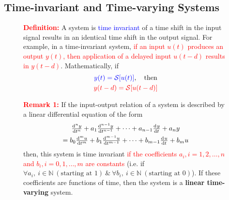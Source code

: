 \documentclass[../notes-main.tex]{subfiles}
\begin{document}
\subsection{Time-invariant and Time-varying Systems}
\begin{figure}[H]
    \centering
    \begin{mdframed}
        \begin{center}
            \textcolor{red}{\textbf{Definition:}} A system is \textcolor{blue}{time invariant} of a time shift in the input signal results in an identical time shift in the output signal. For example, in a time-invariant system, \textcolor{red}{if an input \(u(t)\) produces an output \(y(t)\), then application of a delayed input \(u(t - d)\) results in \(y(t - d)\)}. Mathematically, if
            \begin{gather}
                \textcolor{blue}{y(t) = \mathcal{S}[u(t)]}, \quad \text{then}\\ \textcolor{red}{y(t - d) = \mathcal{S}[u(t - d)]}
                \label{eq:time-invariant-system-def-1}
            \end{gather}
        \end{center}
    \end{mdframed}\label{fig:time-invariant-system-def-1}
    \vspace{-1em}
\end{figure}
\begin{figure}[H]
    \centering
    \begin{mdframed}
        \begin{center}
            \textcolor{red}{\textbf{Remark 1:}} If the input-output relation of a system is described by a linear differential equation of the form
            \begin{gather}
                \od[n]{y}{t} + a_1\od[n-1]{y}{t} + \dots + a_{n-1} \od{y}{t} + a_ny\\ 
                = b_0\od[m]{u}{t} + b_1\od[m-1]{u}{t} + \dots + b_{m-1}\od{u}{t} + b_mu
            \end{gather}
            then, this system is time invariant \textcolor{red}{if the coefficients \(a_i, i = 1,2,\ldots,n\) and \(b_i, i = 0,1,\ldots,m\) are constants} (i.e. if \(\forall a_i, \ i \in \mathbb{N}\ (\text{starting at 1})\ \& \ \forall b_i, \ i \in \mathbb{N}\ (\text{starting at 0})\)). If these coefficients are functions of time, then the system is a \textbf{linear time-varying} system.
        \end{center}
    \end{mdframed}\label{fig:time-varying-system-def-1}
    \vspace{-1em}
\end{figure}
\end{document}
